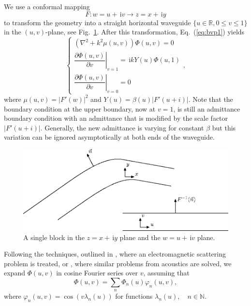 \documentclass[numreferences]{kluwer}
\providecommand{\abs}[1]{\left\lvert#1\right\rvert}
\renewcommand{\phi}{\varphi}
\renewcommand{\Phi}{\varPhi}
\renewcommand{\i}{\,\mathrm{i}}
\newcommand{\R}{\mathbb R}
\newcommand{\pd}[2]{\dfrac{\partial#1}{\partial#2}}
\renewcommand{\Phi}{\varPhi}
\begin{document}
We use a conformal mapping
\begin{equation*}
  F:w=u+\i v\to z=x+\i y
\end{equation*}
to transform the geometry into a straight horizontal waveguide
\mbox{$\{u\in\R,0\le v\le1\}$} in the $(u,v)$-plane, see
Fig.~\ref{fig:confmap}. After this transformation, Eq.~(\ref{eq:bvp1})
yields
\begin{equation}
  \label{eq:bvp2}
  \begin{cases}
    \left(\nabla^2+k^2\mu(u,v)\right)\Phi(u,v)=0\\[1ex]
    \left.\pd{\Phi(u,v)}v\right|_{v=1}=\i kY(u)\Phi(u,1)\\[1.5ex]
    \left.\pd{\Phi(u,v)}v\right|_{v=0}=0
  \end{cases},
\end{equation}
where $\mu(u,v)=\abs{F'(w)}^2$ and $Y(u)=\beta(u)\abs{F'(u+i)}$. Note
that the boundary condition at the upper boundary, now at $v=1$, is
still an admittance boundary condition with an admittance that is
modified by the scale factor $\abs{F'(u+i)}$. Generally, the new
admittance is varying for constant $\beta$ but this variation can be
ignored asymptotically at both ends of the waveguide.
\begin{figure}[htb]
  \centering
  \includegraphics[scale=1]{waveguide-3}
  \caption{A single block in the $z=x+\i y$ plane and the $w=u+\i v$
    plane.}
  \label{fig:confmap}
\end{figure}

Following the techniques, outlined in \cite{Andersson-Nilsson:2009},
where an electromagnetic scattering problem is treated, or
\cite{Nilsson:2002}, where similar problems from acoustics are solved,
we expand $\Phi(u,v)$ in cosine Fourier series over $v$, assuming that
\begin{equation}
  \label{eq:fcosseries}
  \Phi(u,v)=\sum_n\Phi_n(u)\phi_n(u,v),
\end{equation}
where $\phi_n(u,v)=\cos(v\lambda_n(u))$ for functions
$\lambda_n(u),\quad n\in\mathbb N$.
\end{document}
